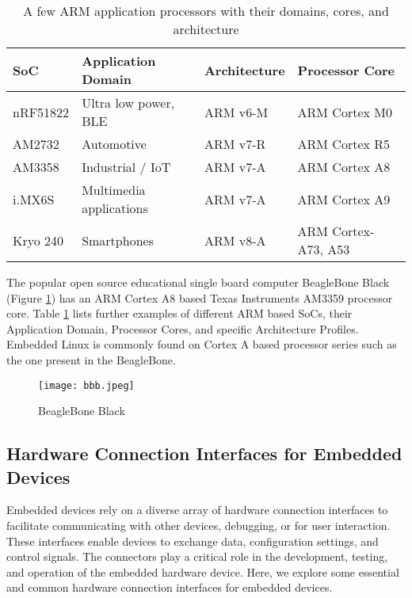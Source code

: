 \begin{table}[h]
	\centering
	\begin{tabular}{ |p{5em}|p{10em}|p{7em}|p{10em}| }
		\hline
			\textbf{SoC} &
			\textbf{Application Domain} &
			\textbf{Architecture} &
			\textbf{Processor Core} \\
		\hline
			nRF51822 &
			Ultra low power, BLE &
			ARM v6-M &
			ARM Cortex M0 \\
		\hline
			AM2732 &
			Automotive &
			ARM v7-R &
			ARM Cortex R5 \\
		\hline
			AM3358 &
			Industrial / IoT &
			ARM v7-A &
			ARM Cortex A8 \\
		\hline
			i.MX6S &
			Multimedia applications &
			ARM v7-A &
			ARM Cortex A9 \\
		\hline
			Kryo 240 &
			Smartphones &
			ARM v8-A &
			ARM Cortex-A73, A53 \\
		\hline
	\end{tabular}
	\caption{A few ARM application processors with their domains, cores, and architecture}
	\label{table:arm}
\end{table}

The popular open source educational single board computer BeagleBone Black (Figure \ref{fig:bbb}) has an ARM Cortex A8 based Texas Instruments AM3359 processor core. Table \ref{table:arm} lists further examples of different ARM based SoCs, their Application Domain, Processor Cores, and specific Architecture Profiles. Embedded Linux is commonly found on Cortex A based processor series such as the one present in the BeagleBone.

\begin{figure}[h]
	\centering
	\texttt{[image: bbb.jpeg]}
	\caption{BeagleBone Black}
	\label{fig:bbb}
\end{figure}

\subsection{Hardware Connection Interfaces for Embedded Devices}

Embedded devices rely on a diverse array of hardware connection interfaces to facilitate communicating with other devices, debugging, or for user interaction. These interfaces enable devices to exchange data, configuration settings, and control signals. The connectors play a critical role in the development, testing, and operation of the embedded hardware device. Here, we explore some essential and common hardware connection interfaces for embedded devices.


